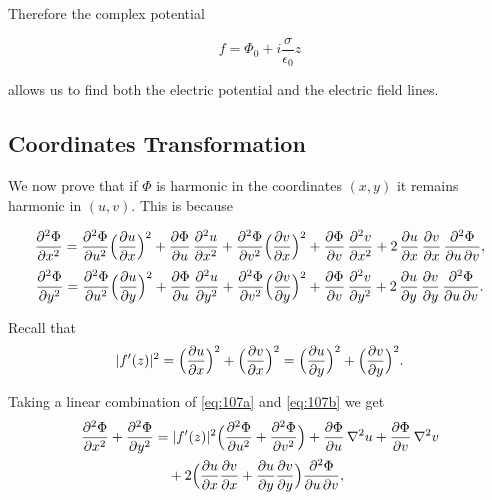 \documentclass[english,a4paper,12pt]{report}
\begin{document}
Therefore the complex potential 

\begin{equation}
    f = \Phi _{0} + i \frac{\sigma }{\epsilon_0 }z  
\end{equation}

allows us to find both the electric potential and the electric field lines.

\subsection{Coordinates Transformation}

We now prove that if \(\Phi \) is harmonic in the coordinates \((x,y)\) it remains harmonic in \((u,v)\). This is because 

\begin{equation}\label{eq:107a}
\frac{\partial^2\Phi}{\partial x^2}
=\frac{\partial^2\Phi}{\partial u^2}\Bigl(\frac{\partial u}{\partial x}\Bigr)^2
+\frac{\partial\Phi}{\partial u}\,\frac{\partial^2u}{\partial x^2}
+\frac{\partial^2\Phi}{\partial v^2}\Bigl(\frac{\partial v}{\partial x}\Bigr)^2
+\frac{\partial\Phi}{\partial v}\,\frac{\partial^2v}{\partial x^2}
+2\,\frac{\partial u}{\partial x}\,\frac{\partial v}{\partial x}\,
\frac{\partial^2\Phi}{\partial u\,\partial v},
\end{equation}
\begin{equation}\label{eq:107b}
\frac{\partial^2\Phi}{\partial y^2}
=\frac{\partial^2\Phi}{\partial u^2}\Bigl(\frac{\partial u}{\partial y}\Bigr)^2
+\frac{\partial\Phi}{\partial u}\,\frac{\partial^2u}{\partial y^2}
+\frac{\partial^2\Phi}{\partial v^2}\Bigl(\frac{\partial v}{\partial y}\Bigr)^2
+\frac{\partial\Phi}{\partial v}\,\frac{\partial^2v}{\partial y^2}
+2\,\frac{\partial u}{\partial y}\,\frac{\partial v}{\partial y}\,
\frac{\partial^2\Phi}{\partial u\,\partial v}.
\end{equation}

Recall that
\begin{equation}\label{eq:108}
\lvert f'(z)\rvert^2
=\Bigl(\frac{\partial u}{\partial x}\Bigr)^2
+\Bigl(\frac{\partial v}{\partial x}\Bigr)^2
=\Bigl(\frac{\partial u}{\partial y}\Bigr)^2
+\Bigl(\frac{\partial v}{\partial y}\Bigr)^2.
\end{equation}

Taking a linear combination of \eqref{eq:107a} and \eqref{eq:107b} we get
\begin{equation}\label{eq:109}
\begin{split}
\frac{\partial^2\Phi}{\partial x^2}+\frac{\partial^2\Phi}{\partial y^2}
&=\lvert f'(z)\rvert^2\Bigl(\frac{\partial^2\Phi}{\partial u^2}
+\frac{\partial^2\Phi}{\partial v^2}\Bigr)
+\frac{\partial\Phi}{\partial u}\,\nabla^2u
+\frac{\partial\Phi}{\partial v}\,\nabla^2v\\
&\quad
+2\Bigl(\frac{\partial u}{\partial x}\frac{\partial v}{\partial x}
+\frac{\partial u}{\partial y}\frac{\partial v}{\partial y}\Bigr)
\frac{\partial^2\Phi}{\partial u\,\partial v},
\end{split}
\end{equation}
\end{document}

